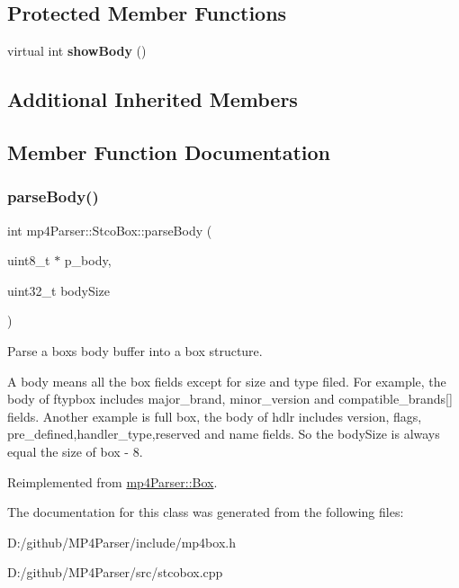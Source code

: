 \subsection*{Protected Member Functions}
\begin{DoxyCompactItemize}
\item 
\mbox{\label{classmp4_parser_1_1_stco_box_a5d3d3436f6f6b827e6ed389ba08ab55d}} 
virtual int {\bfseries show\+Body} ()
\end{DoxyCompactItemize}
\subsection*{Additional Inherited Members}


\subsection{Member Function Documentation}
\mbox{\label{classmp4_parser_1_1_stco_box_a94fe370219871eb204611637fa482449}} 
\subsubsection{\texorpdfstring{parseBody()}{parseBody()}}
{\footnotesize\ttfamily int mp4\+Parser\+::\+Stco\+Box\+::parse\+Body (\begin{DoxyParamCaption}\item[{uint8\+\_\+t $\ast$}]{p\+\_\+body,  }\item[{uint32\+\_\+t}]{body\+Size }\end{DoxyParamCaption})\hspace{0.3cm}{\ttfamily [virtual]}}



Parse a box\textquotesingle{}s body buffer into a box structure. 

A body means all the box fields except for size and type filed. For example, the body of ftypbox includes major\+\_\+brand, minor\+\_\+version and compatible\+\_\+brands\mbox{[}\mbox{]} fields. Another example is full box, the body of hdlr includes version, flags, pre\+\_\+defined,handler\+\_\+type,reserved and name fields. So the body\+Size is always equal the size of box -\/ 8. 

Reimplemented from \mbox{\hyperlink{classmp4_parser_1_1_box_a3dd0c084ac65bc77b69ac5ecaf796cb2}{mp4\+Parser\+::\+Box}}.



The documentation for this class was generated from the following files\+:\begin{DoxyCompactItemize}
\item 
D\+:/github/\+M\+P4\+Parser/include/mp4box.\+h\item 
D\+:/github/\+M\+P4\+Parser/src/stcobox.\+cpp\end{DoxyCompactItemize}
